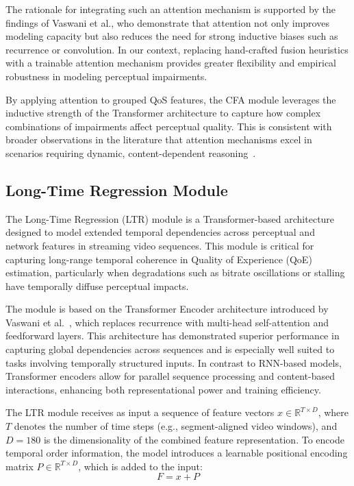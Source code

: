 The rationale for integrating such an attention mechanism is supported by the findings of Vaswani et al., who demonstrate that attention not only improves modeling capacity but also reduces the need for strong inductive biases such as recurrence or convolution. In our context, replacing hand-crafted fusion heuristics with a trainable attention mechanism provides greater flexibility and empirical robustness in modeling perceptual impairments.

By applying attention to grouped QoS features, the CFA module leverages the inductive strength of the Transformer architecture to capture how complex combinations of impairments affect perceptual quality. This is consistent with broader observations in the literature that attention mechanisms excel in scenarios requiring dynamic, content-dependent reasoning~\cite{vaswani2017attention}.

\subsection{Long-Time Regression Module}

The Long-Time Regression (LTR) module is a Transformer-based architecture designed to model extended temporal dependencies across perceptual and network features in streaming video sequences. This module is critical for capturing long-range temporal coherence in Quality of Experience (QoE) estimation, particularly when degradations such as bitrate oscillations or stalling have temporally diffuse perceptual impacts.

The module is based on the Transformer Encoder architecture introduced by Vaswani et al.~\cite{vaswani2017attention}, which replaces recurrence with multi-head self-attention and feedforward layers. This architecture has demonstrated superior performance in capturing global dependencies across sequences and is especially well suited to tasks involving temporally structured inputs. In contrast to RNN-based models, Transformer encoders allow for parallel sequence processing and content-based interactions, enhancing both representational power and training efficiency.

The LTR module receives as input a sequence of feature vectors $x \in \mathbb{R}^{T \times D}$, where $T$ denotes the number of time steps (e.g., segment-aligned video windows), and $D = 180$ is the dimensionality of the combined feature representation. To encode temporal order information, the model introduces a learnable positional encoding matrix $P \in \mathbb{R}^{T \times D}$, which is added to the input:
\[
F = x + P
\]

